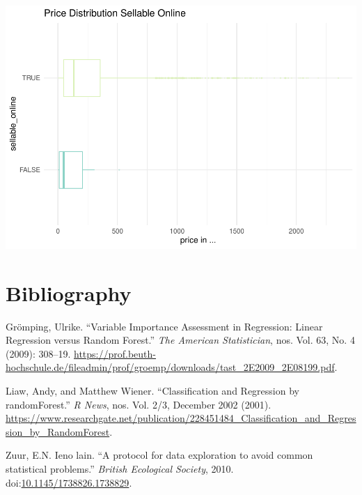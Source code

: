 \documentclass[a4paper, nobind]{templates/ociamthesis}
\newcommand*{\bibtitle}{Works Cited}
\begin{document}
\includegraphics{_main_files/figure-latex/unnamed-chunk-8-1.pdf}

\hypertarget{bibliography}{%
\chapter{Bibliography}\label{bibliography}}

\hypertarget{refs}{}
\leavevmode\hypertarget{ref-Groemping2009}{}%
Grömping, Ulrike. ``Variable Importance Assessment in Regression: Linear Regression versus Random Forest.'' \emph{The American Statistician}, nos. Vol. 63, No. 4 (2009): 308--19. \url{https://prof.beuth-hochschule.de/fileadmin/prof/groemp/downloads/tast_2E2009_2E08199.pdf}.

\leavevmode\hypertarget{ref-Liaw2002}{}%
Liaw, Andy, and Matthew Wiener. ``Classification and Regression by randomForest.'' \emph{R News}, nos. Vol. 2/3, December 2002 (2001). \url{https://www.researchgate.net/publication/228451484_Classification_and_Regression_by_RandomForest}.

\leavevmode\hypertarget{ref-Zuur2010}{}%
Zuur, E.N. Ieno lain. ``A protocol for data exploration to avoid common statistical problems.'' \emph{British Ecological Society}, 2010. doi:\href{https://doi.org/10.1145/1738826.1738829}{10.1145/1738826.1738829}.




\setlength{\baselineskip}{0pt} %

{\renewcommand*\MakeUppercase[1]{#1}%
\printbibliography[heading=bibintoc,title={\bibtitle}]}
\end{document}
